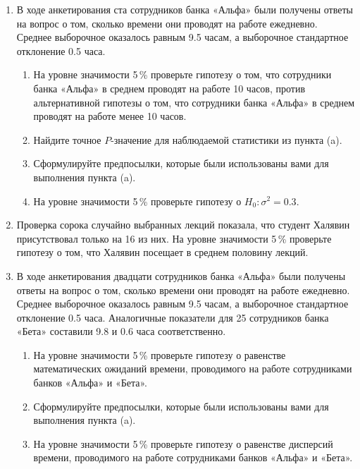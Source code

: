 \begin{enumerate}

\item В ходе анкетирования ста сотрудников банка «Альфа» были получены ответы на вопрос о том, сколько времени они проводят на работе ежедневно. Среднее выборочное оказалось равным 9.5 часам, а выборочное стандартное отклонение 0.5 часа.
\begin{enumerate}
  \item На уровне значимости 5\,\% проверьте гипотезу о том, что сотрудники банка «Альфа» в среднем проводят на работе 10 часов, против альтернативной гипотезы о том, что сотрудники банка «Альфа» в среднем проводят на работе менее 10 часов.
  \item Найдите точное $P$-значение для наблюдаемой статистики из пункта (a).
  \item Сформулируйте предпосылки, которые были использованы вами для выполнения пункта (a).
  \item На уровне значимости 5\,\% проверьте гипотезу о $H_0 \colon \sigma^2 = 0.3$.
\end{enumerate}


\item
Проверка сорока случайно выбранных лекций показала, что студент Халявин присутствовал только на 16 из них. На уровне значимости 5\,\% проверьте гипотезу о том, что Халявин посещает в среднем половину лекций.

\item
В ходе анкетирования двадцати сотрудников банка «Альфа» были получены ответы на вопрос о том, сколько времени они проводят на работе ежедневно. Среднее выборочное оказалось равным 9.5 часам, а выборочное стандартное отклонение 0.5 часа. Аналогичные показатели для 25 сотрудников банка «Бета» составили 9.8 и 0.6 часа соответственно.
\begin{enumerate}
  \item На уровне значимости 5\,\% проверьте гипотезу о равенстве математических ожиданий времени, проводимого на работе сотрудниками банков «Альфа» и «Бета».
  \item Сформулируйте предпосылки, которые были использованы вами для выполнения пункта (a).
  \item На уровне значимости 5\,\% проверьте гипотезу о равенстве дисперсий времени, проводимого на работе сотрудниками банков «Альфа» и «Бета».
\end{enumerate}




\end{enumerate}
